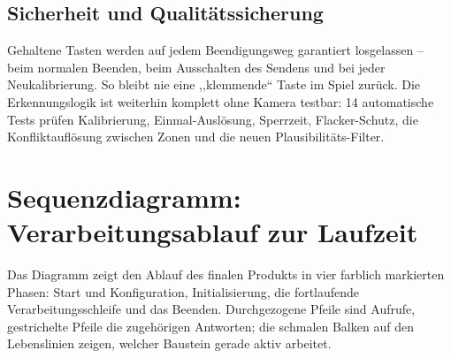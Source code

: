\documentclass[12pt,a4paper]{article}
\begin{document}
\subsection{Sicherheit und Qualitätssicherung}

Gehaltene Tasten werden auf jedem Beendigungsweg garantiert losgelassen -- beim normalen Beenden, beim Ausschalten des Sendens und bei jeder Neukalibrierung. So bleibt nie eine ,,klemmende`` Taste im Spiel zurück. Die Erkennungslogik ist weiterhin komplett ohne Kamera testbar: 14 automatische Tests prüfen Kalibrierung, Einmal-Auslösung, Sperrzeit, Flacker-Schutz, die Konfliktauflösung zwischen Zonen und die neuen Plausibilitäts-Filter.

\section{Sequenzdiagramm: Verarbeitungsablauf zur Laufzeit}

Das Diagramm zeigt den Ablauf des finalen Produkts in vier farblich markierten Phasen: Start und Konfiguration, Initialisierung, die fortlaufende Verarbeitungsschleife und das Beenden. Durchgezogene Pfeile sind Aufrufe, gestrichelte Pfeile die zugehörigen Antworten; die schmalen Balken auf den Lebenslinien zeigen, welcher Baustein gerade aktiv arbeitet.
\end{document}
